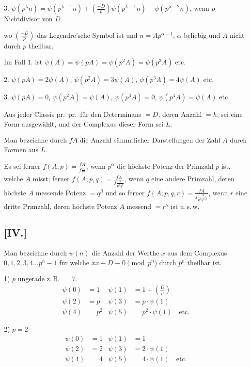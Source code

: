 \documentclass[12pt,a4paper]{article}
\begin{document}
3. $\psi(p^\lambda n) = \psi(p^{\lambda-1}n) + \left(\frac{-D}{p}\right)\psi(p^{\lambda-1}n) - \psi(p^{\lambda-2}n)$, wenn $p$ Nichtdivisor von $D$

wo $\left(\frac{-D}{p}\right)$ das Legendre'sche Symbol ist und $n = Ap^{\alpha-1}$, $\alpha$ beliebig und $A$ nicht durch $p$ theilbar.

Im Fall 1. ist $\psi(A) = \psi(pA) = \psi(p^2A) = \psi(p^3A)$ etc.

2. $\psi(pA) = 2\psi(A)$, $\psi(p^2A) = 3\psi(A)$, $\psi(p^3A) = 4\psi(A)$ etc.

3. $\psi(pA) = 0$, $\psi(p^2A) = \psi(A)$, $\psi(p^3A) = 0$, $\psi(p^4A) = \psi(A)$ etc.

Aus jeder Classis pr.\ pr.\ f\"ur den Determinans $=D$, deren Anzahl $=h$, sei eine Form ausgew\"ahlt, und der Complexus dieser Form sei $L$.

Man bezeichne durch $fA$ die Anzahl s\"ammtlicher Darstellungen der Zahl $A$ durch Formen aus $L$.

Es sei ferner $f(A;p) = \frac{fA}{f\frac{A}{p^\alpha}}$, wenn $p^\alpha$ die h\"ochste Potenz der Primzahl $p$ ist, welche $A$ misst; ferner $f(A;p,q) = \frac{fA}{f\frac{A}{p^\alpha q^\beta}}$, wenn $q$ eine andere Primzahl, deren h\"ochste $A$ messende Potenz $=q^\beta$ und so ferner $f(A;p,q,r) = \frac{fA}{f\frac{A}{p^\alpha q^\beta r^\gamma}}$, wenn $r$ eine dritte Primzahl, deren h\"ochste Potenz $A$ messend $=r^\gamma$ ist u.\,s.\,w.

\subsection*{[IV.]}

Man bezeichne durch $\psi(n)$ die Anzahl der Werthe $x$ aus dem Complexus $0, 1, 2, 3, 4\ldots p^n-1$ f\"ur welche $xx-D\equiv 0 \pmod{p^n}$ durch $p^n$ theilbar ist.

1) $p$ ungerade z.\,B.\ $=7$.
\begin{align*}
\psi(0) &= 1 & \psi(1) &= 1+\left(\frac{D}{p}\right)\\
\psi(2) &= p & \psi(3) &= p\cdot\psi(1)\\
\psi(4) &= p^2 & \psi(5) &= p^2\cdot\psi(1) \quad\text{etc.}
\end{align*}

2) $p=2$
\begin{align*}
\psi(0) &= 1 & \psi(1) &= 1\\
\psi(2) &= 2 & \psi(3) &= 2\cdot\psi(1)\\
\psi(4) &= 4 & \psi(5) &= 4\cdot\psi(1) \quad\text{etc.}
\end{align*}
\end{document}

